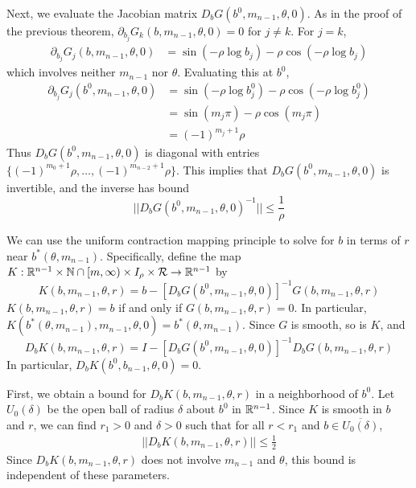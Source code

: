 \documentclass[thesis.tex]{subfiles}
\begin{document}
Next, we evaluate the Jacobian matrix $D_b G(b^0, m_{n-1}, \theta, 0)$. As in the proof of the previous theorem, $\partial_{b_j} G_k(b, m_{n-1}, \theta, 0) = 0$ for $j \neq k$. For $j = k$,
\begin{align*}
\partial_{b_j} G_j(b, m_{n-1}, \theta, 0) &= \sin \left( -\rho \log b_j \right) - \rho \cos \left( -\rho \log b_j \right) 
\end{align*}
which involves neither $m_{n-1}$ nor $\theta$. Evaluating this at $b^0$,
\begin{align*}
\partial_{b_j} G_j(b^0, m_{n-1}, \theta, 0) &= \sin \left( -\rho \log b_j^0 \right) - \rho \cos \left( -\rho \log b_j^0 \right) \\
&= \sin \left( m_j \pi \right) - \rho \cos \left(m_j \pi \right) \\
&= (-1)^{m_j + 1} \rho
\end{align*}
Thus $D_b G(b^0, m_{n-1}, \theta, 0)$ is diagonal with entries $\{ (-1)^{m_0 + 1} \rho, \dots, (-1)^{m_{n-2} + 1} \rho \}$. This implies that $D_b G(b^0, m_{n-1}, \theta, 0)$ is invertible, and the inverse has bound
\begin{equation}\label{DbG0invbound}
||D_b G(b^0, m_{n-1}, \theta, 0)^{-1}|| \leq \frac{1}{\rho}
\end{equation}

We can use the uniform contraction mapping principle to solve for $b$ in terms of $r$ near $b^*(\theta, m_{n-1})$. Specifically, define the map $K: {\mathbb R}^{n-1} \times {\mathbb N} \cap [m, \infty) \times I_\rho \times \mathcal{R} \rightarrow {\mathbb R}^{n-1}$ by
\begin{equation}\label{defKb}
K(b, m_{n-1}, \theta, r) = b - [D_b G(b^0, m_{n-1}, \theta, 0)]^{-1} G(b, m_{n-1}, \theta, r)
\end{equation}
$K(b, m_{n-1}, \theta, r) = b$ if and only if $G(b, m_{n-1}, \theta, r) = 0$. In particular, $K(b^*(\theta, m_{n-1}), m_{n-1}, \theta, 0) = b^*(\theta, m_{n-1})$. Since $G$ is smooth, so is $K$, and 
\begin{equation}\label{DbK}
D_b K(b, m_{n-1}, \theta, r) = I - [D_b G(b^0, m_{n-1}, \theta, 0)]^{-1} D_b G(b, m_{n-1}, \theta, r)
\end{equation}
In particular, $D_b K(b^0, b_{n-1}, \theta, 0) = 0$.

First, we obtain a bound for $D_b K(b, m_{n-1}, \theta, r)$ in a neighborhood of $b^0$. Let $U_0(\delta)$ be the open ball of radius $\delta$ about $b^0$ in ${\mathbb R}^{n-1}$. Since $K$ is smooth in $b$ and $r$, we can find $r_1 > 0$ and $\delta > 0$ such that for all $r < r_1$ and $b \in \overline{ U_0(\delta) }$,  
\begin{align}\label{DbKbound}
|| D_b K(b, m_{n-1}, \theta, r)|| \leq \frac{1}{2}
\end{align}
Since $D_b K(b, m_{n-1}, \theta, r)$ does not involve $m_{n-1}$ and $\theta$, this bound is independent of these parameters.
\end{document}
